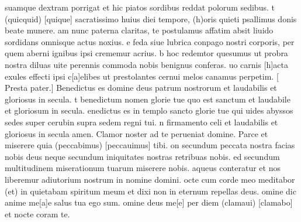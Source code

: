 \documentclass[letter,12pt]{book}
\newcommand*\zallmancaps{\usefont{U}{Zallman}{xl}{n}}
\begin{document}
suamque dextram porrigat
et hic piatos sordibus
reddat polorum sedibus.
t (quicquid) [quique] sacratissimo
huius diei tempore,
(h)oris quieti psallimus
donis beate munere.
am nunc paterna claritas,
te postulamus affatim
absit liuido sordidans
omnisque actus noxius.
e feda siue lubrica
conpago nostri corporis,
per quem aberni ignibus
ipsi crememur acrius.
b hoc redemtor quesumus
ut probra nostra diluas
uite perennis commoda
nobis benignus conferas.
uo carnis [h]acta exules
effecti ipsi c[a]elibes
ut prestolantes cernui
melos canamus perpetim. [{\color{Red} P}resta pater.]
\lettrine[lines=2]{\color{Red} \zallmancaps B}{}enedictus es domine deus patrum nostrorum et laudabilis et gloriosus in secula.
t benedictum nomen glorie tue quo est sanctum et laudabile et gloriosum in secula.
enedictus es in templo sancto glorie tue qui uides abyssos sedes super cerubin supra sedem regni tui.
n firmamento celi et laudabilis et gloriosus in secula amen.%
\lettrine[lines=2]{\color{Red} \zallmancaps C}{}lamor noster ad te perueniat domine.
\newline Parce et miserere quia (peccabimus) [peccauimus] tibi.
on secundum peccata nostra facias nobis deus neque secundum iniquitates nostras retribuas nobis.
ed secundum multitudinem miserationum tuarum miserere nobis.
aqueus conteratur et nos liberemur adiutorium nostrum in nomine domini.
octe cum corde meo meditabor (et) in quietabam
spiritum meum et dixi non in eternum repellas deus.
omine dic anime me[a]e salus tua ego sum.
omine deus me[e] per diem (clamaui) [clamabo] et nocte coram te.
\end{document}
